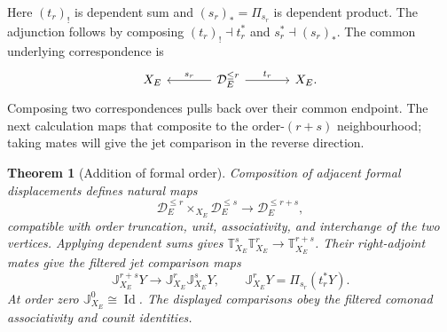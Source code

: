 \documentclass[11pt,a4paper]{article}
\numberwithin{algorithm}{section}
\numberwithin{equation}{section}
\newtheorem{theorem}{Theorem}[section]
\theoremstyle{definition}
\theoremstyle{remark}
\theoremstyle{plain}
\newcommand{\Id}{\operatorname{Id}}
\theoremstyle{definition}
\theoremstyle{plain}
\begin{document}
Here $(t_r)_!$ is dependent sum and $(s_r)_*=\Pi_{s_r}$ is
dependent product.  The adjunction follows by composing
$(t_r)_!\dashv t_r^*$ and $s_r^*\dashv(s_r)_*$.
The common underlying correspondence is
\[
\begin{tikzcd}[column sep=large]
 X_E & \mathcal D_E^{\le r}
   \arrow[l,"{s_r}"'] \arrow[r,"{t_r}"] & X_E .
\end{tikzcd}
\]
Composing two correspondences pulls back over their common
endpoint. The next calculation maps that composite to the
order-$(r+s)$ neighbourhood; taking mates will give the jet
comparison in the reverse direction.


\begin{theorem}[Addition of formal order]
\label{thm:jet-order-addition}
Composition of adjacent formal displacements defines natural maps
\[
 \mathcal D_E^{\le r}\times_{X_E}\mathcal D_E^{\le s}
 \longrightarrow\mathcal D_E^{\le r+s},
\]
compatible with order truncation, unit, associativity, and
interchange of the two vertices.  Applying dependent sums gives
$\mathbb T_{X_E}^s\mathbb T_{X_E}^r\to\mathbb T_{X_E}^{r+s}$.
Their right-adjoint mates give the filtered jet comparison maps
\begin{equation}\label{eq:jet-order-addition}
 \mathbb J_{X_E}^{r+s}Y
 \longrightarrow
 \mathbb J_{X_E}^{r}\mathbb J_{X_E}^{s}Y,
 \qquad
 \mathbb J_{X_E}^rY=\Pi_{s_r}(t_r^*Y).
\end{equation}
At order zero $\mathbb J^0_{X_E}\cong\Id$.  The displayed
comparisons obey the filtered comonad associativity and counit
identities.
\end{theorem}
\end{document}
